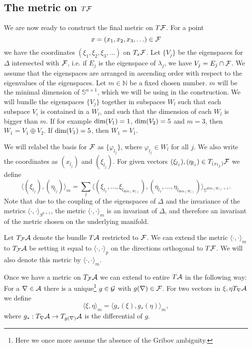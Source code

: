 \documentclass[letterpaper,12pt]{article}
\def\ca{{\cal A}}
\def\cf{{\cal F}}
\def\cg{{\cal G}}
\newcommand{\cF}{{\cal F}}
\begin{document}
\subsection{The metric on $T\cF$}

We are now ready to construct the final metric on $T\cF$. For a point $$x=(x_1,x_2,x_3,\ldots) \in \cf$$ 
we have the coordinates $(\xi_1,\xi_2,\xi_3,\ldots)$ on $T_x\cF$. Let $\{ V_j\}$ be the eigenspaces for $\Delta $ intersected with $\cF$, i.e. if $E_j$ is the eigenspace of $\lambda_j$, we have $V_j=E_j \cap \cF$. We assume that the eigenspaces are arranged in ascending order with respect to the eigenvalues of the eigenspaces. Let $m\in \mathbb{N}$ be a fixed chosen number. $m$ will be the minimal dimension of $\mathbb{S}^{n+1}$, which we will be using in the construction.   We will bundle the eigenspaces $\{ V_j\}$ together in subspaces $W_l$ such that each subspace $V_i$ is contained in a $W_l$, and such that the dimension of each $W_l$ is bigger than $m$. If for example $\hbox{dim} (V_1)=1$, $\hbox{dim} (V_2)=5$ and $m=3$, then $W_1=V_1\oplus V_2 $. If $\hbox{dim} (V_1)=5$, then $W_1=V_1 $. 

We will relabel the basis for $\cF$ as $\{ \varphi_{l_j}\}$, where $\varphi_{l_j}\in W_l$ for all $j$. We also write the coordinates as $(x_{l_j})$ and $(\xi_{l_j})$.
For given vectors $(\xi_{l_j}),(\eta_{l_j})\in T_{(x_{l_j})} \cF$ we define
$$  \langle (\xi_{l_j})    , (\eta_{l_j})  \rangle_m = \sum_{l} \langle (\xi_{l_1}, \ldots ,\xi_{l_{dim ( W_l)}}) , (\eta_{l_1}, \ldots ,\eta_{l_{dim ( W_l)}}) \rangle_{\mathbb{S}^{dim (W_l)+1}} .$$
%
Note that due to the coupling of the eigenspaces of $\Delta$ and the invariance of the metrics $\langle \cdot ,\cdot \rangle_{S^{k+1}}$, the metric $\langle \cdot ,\cdot \rangle_m$ is an invariant of $\Delta$, and therefore an invariant of the metric chosen on the underlying manifold.

Let $T_\cf\ca$ denote the bundle $T\ca$ restricted to $\cf$. We can extend the metric $\langle \cdot ,\cdot \rangle_m$ to  $T_\cf\ca$ be setting it equal to $\langle \cdot , \cdot \rangle_p$ on the directions orthogonal to $T\cf$. We will also denote this metric by $\langle \cdot ,\cdot \rangle_m$.

Once we have a metric on $T_\cf\ca$ we can extend to entire $T\ca$ in the following way: For a $\nabla \in \ca$ there is a unique\footnote{ Here we once more assume the absence of the Gribov ambiguity.} $g\in \cg$ with $g(\nabla )\in \cf$. For two vectors in $\xi,\eta T_\nabla \ca$ we define
\begin{equation}
\langle \xi , \eta  \rangle_m = \langle g_*(\xi) , g_*(\eta)  \rangle_m  ,
\label{Georgia}
\end{equation}
where $g_*:T_\nabla \ca \to T_{g(\nabla)}\ca$ is the differential of $g$. 
\end{document}
